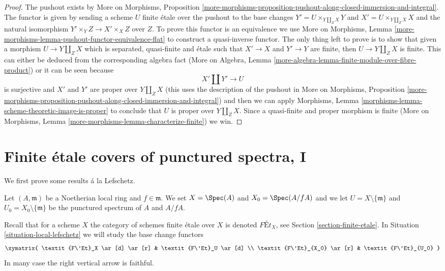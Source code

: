 \begin{proof}
The pushout exists by
More on Morphisms, Proposition
\ref{more-morphisms-proposition-pushout-along-closed-immersion-and-integral}.
The functor is given by sending a scheme $U$ finite \'etale over the
pushout to the base changes $Y' = U \times_{Y \amalg_Z X} Y$
and $X' = U \times_{Y \amalg_Z X} X$ and the natural isomorphism
$Y' \times_Y Z \to X' \times_X Z$ over $Z$. To prove this functor
is an equivalence we use
More on Morphisms, Lemma
\ref{more-morphisms-lemma-pushout-functor-equivalence-flat}
to construct a quasi-inverse functor.
The only thing left to prove is to show that given a morphism
$U \to Y \amalg_Z X$ which is separated, quasi-finite and \'etale
such that $X' \to X$ and $Y' \to Y$ are finite,
then $U \to Y \amalg_Z X$ is finite.
This can either be deduced from the corresponding algebra fact
(More on Algebra, Lemma
\ref{more-algebra-lemma-finite-module-over-fibre-product})
or it can be seen because
$$
X' \amalg Y' \to U
$$
is surjective and $X'$ and $Y'$ are proper over $Y \amalg_Z X$
(this uses the description of the pushout in More on Morphisms, Proposition
\ref{more-morphisms-proposition-pushout-along-closed-immersion-and-integral})
and then we can apply
Morphisms, Lemma \ref{morphisms-lemma-scheme-theoretic-image-is-proper}
to conclude that $U$ is proper over $Y \amalg_Z X$.
Since a quasi-finite and proper morphism is finite
(More on Morphisms, Lemma \ref{more-morphisms-lemma-characterize-finite})
we win.
\end{proof}





\section{Finite \'etale covers of punctured spectra, I}
\label{section-pi1-punctured-spec}

\noindent
We first prove some results \'a la Lefschetz.

\begin{situation}
\label{situation-local-lefschetz}
Let $(A, \mathfrak m)$ be a Noetherian local ring and $f \in \mathfrak m$.
We set $X = \Spec(A)$ and $X_0 = \Spec(A/fA)$ and we
let $U = X \setminus \{\mathfrak m\}$ and
$U_0 = X_0 \setminus \{\mathfrak m\}$ be the punctured spectrum of
$A$ and $A/fA$.
\end{situation}

\noindent
Recall that for a scheme $X$ the category of schemes finite
\'etale over $X$ is denoted $\textit{F\'Et}_X$, see
Section \ref{section-finite-etale}.
In Situation \ref{situation-local-lefschetz}
we will study the base change functors
$$
\xymatrix{
\textit{F\'Et}_X \ar[d] \ar[r] & \textit{F\'Et}_U \ar[d] \\
\textit{F\'Et}_{X_0} \ar[r] & \textit{F\'Et}_{U_0}
}
$$
In many case the right vertical arrow is faithful.

